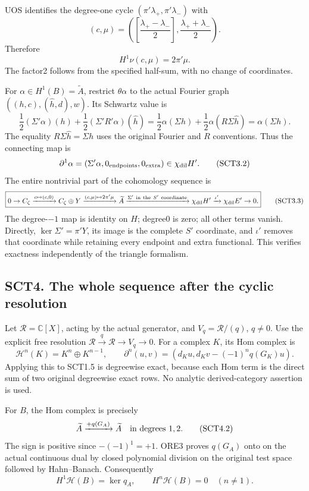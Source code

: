 UOS identifies the degree-one cycle \((\pi'\lambda_+,\pi'\lambda_-)\)
with \[
(c,\mu)=\left(
\left[\frac{\lambda_+-\lambda_-}{2}\right],
\frac{\lambda_++\lambda_-}{2}\right).
\] Therefore \[
\boxed{H^1\nu(c,\mu)=2\pi'\mu.}
\tag{SCT3.1}
\] The factor2 follows from the specified half-sum, with no change of
coordinates.

For \(\alpha\in H^1(B)=\widetilde A\), restrict \(\theta\alpha\) to the
actual Fourier graph \(((h,c),(\widehat h,d),w)\). Its Schwartz value is
\[
\frac12(\Sigma'\alpha)(h)
+\frac12(\Sigma'R'\alpha)(\widehat h)
=\frac12\alpha(\Sigma h)+\frac12\alpha(R\Sigma\widehat h)
=\alpha(\Sigma h).
\] The equality \(R\Sigma\widehat h=\Sigma h\) uses the original Fourier
and \(R\) conventions. Thus the connecting map is \[
\partial^1\alpha=(\Sigma'\alpha,0_{\rm endpoints},0_{\rm extra})
\in\chi_{\rm dil}H'.
\tag{SCT3.2}
\] The entire nontrivial part of the cohomology sequence is \[
\boxed{
0\to C_\zeta\xrightarrow{c\mapsto(c,0)}C_\zeta\oplus Y
\xrightarrow{(c,\mu)\mapsto2\pi'\mu}\widetilde A
\xrightarrow{\Sigma'\ {\rm in\ the}\ S'\ {\rm coordinate}}
\chi_{\rm dil}H'\xrightarrow{\iota'}\chi_{\rm dil}E'\to0.}
\tag{SCT3.3}
\] The degree-\(-1\) map is identity on \(H\); degree0 is zero; all
other terms vanish. Directly, \(\ker\Sigma'=\pi'Y\), its image is the
complete \(S'\) coordinate, and \(\iota'\) removes that coordinate while
retaining every endpoint and extra functional. This verifies exactness
independently of the triangle formalism.

\subsection{SCT4. The whole sequence after the cyclic
resolution}\label{sct4.-the-whole-sequence-after-the-cyclic-resolution}

Let \(\mathcal R=\mathbb C[X]\), acting by the actual generator, and
\(V_q=\mathcal R/(q)\), \(q\ne0\). Use the explicit free resolution
\(\mathcal R\xrightarrow q\mathcal R\to V_q\to0\). For a complex \(K\),
its Hom complex is \[
\mathscr H^n(K)=K^n\oplus K^{n-1},\qquad
\partial^n(u,v)=(d_Ku,d_Kv-(-1)^nq(G_K)u).
\tag{SCT4.1}
\] Applying this to SCT1.5 is degreewise exact, because each Hom term is
the direct sum of two original degreewise exact rows. No analytic
derived-category assertion is used.

For \(B\), the Hom complex is precisely \[
\widetilde A\xrightarrow{+q(G_A)}\widetilde A
\quad\hbox{in degrees }1,2.
\tag{SCT4.2}
\] The sign is positive since \(-(-1)^1=+1\). ORE3 proves \(q(G_A)\)
onto on the actual continuous dual by closed polynomial division on the
original test space followed by Hahn--Banach. Consequently \[
H^1\mathscr H(B)=\ker q_A,\qquad
H^n\mathscr H(B)=0\quad(n\ne1).
\tag{SCT4.3}
\]

